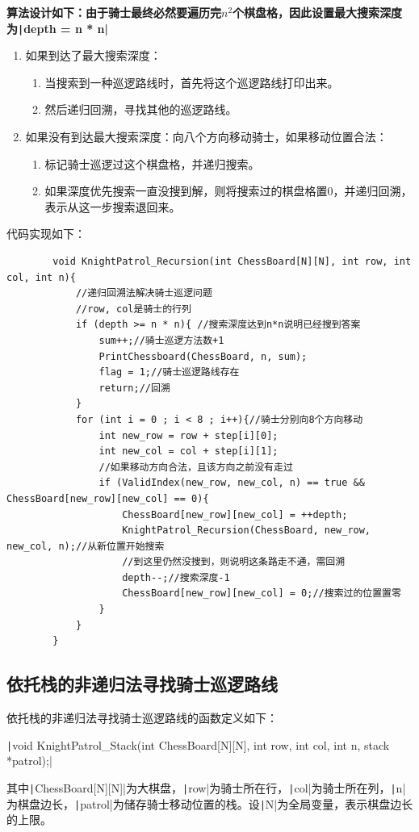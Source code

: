 \documentclass[10pt,a4paper]{article}
\begin{document}
	\noindent \textbf{算法设计如下：由于骑士最终必然要遍历完$n^2$个棋盘格，因此设置最大搜索深度为\texttt|depth = n * n|}
	\begin{enumerate}
		\item 如果到达了最大搜索深度：
		\begin{enumerate}
			\item 当搜索到一种巡逻路线时，首先将这个巡逻路线打印出来。
			\item 然后递归回溯，寻找其他的巡逻路线。
		\end{enumerate}
		\item 如果没有到达最大搜索深度：向八个方向移动骑士，如果移动位置合法：
		\begin{enumerate}
			\item 标记骑士巡逻过这个棋盘格，并递归搜索。
			\item 如果深度优先搜索一直没搜到解，则将搜索过的棋盘格置0，并递归回溯，表示从这一步搜索退回来。
		\end{enumerate}
	\end{enumerate}
	代码实现如下：
	\begin{verbatim}
		void KnightPatrol_Recursion(int ChessBoard[N][N], int row, int col, int n){
			//递归回溯法解决骑士巡逻问题
			//row, col是骑士的行列
			if (depth >= n * n){ //搜索深度达到n*n说明已经搜到答案
				sum++;//骑士巡逻方法数+1
				PrintChessboard(ChessBoard, n, sum);
				flag = 1;//骑士巡逻路线存在
				return;//回溯
			}
			for (int i = 0 ; i < 8 ; i++){//骑士分别向8个方向移动
				int new_row = row + step[i][0];
				int new_col = col + step[i][1];
				//如果移动方向合法，且该方向之前没有走过
				if (ValidIndex(new_row, new_col, n) == true && ChessBoard[new_row][new_col] == 0){
					ChessBoard[new_row][new_col] = ++depth;
					KnightPatrol_Recursion(ChessBoard, new_row, new_col, n);//从新位置开始搜索
					//到这里仍然没搜到，则说明这条路走不通，需回溯
					depth--;//搜索深度-1
					ChessBoard[new_row][new_col] = 0;//搜索过的位置置零
				}
			}
		}
	\end{verbatim}
	\subsection{依托栈的非递归法寻找骑士巡逻路线}
	\noindent 依托栈的非递归法寻找骑士巡逻路线的函数定义如下：
	\begin{center}
		\texttt|void KnightPatrol_Stack(int ChessBoard[N][N], int row, int col, int n, stack *patrol);|
	\end{center}
	其中\texttt|ChessBoard[N][N]|为大棋盘，\texttt|row|为骑士所在行，\texttt|col|为骑士所在列，\texttt|n|为棋盘边长，\texttt|patrol|为储存骑士移动位置的栈。设\texttt|N|为全局变量，表示棋盘边长的上限。\\
\end{document}

